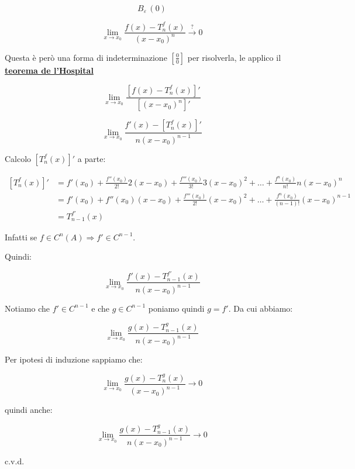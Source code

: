 \documentclass[../../dimostrazioni]{subfiles}
\begin{document}
        \[ B_\varepsilon \, (0)\]

        \[  \lim_{x \to x_0} \frac{f(x)-T _n ^ f (x)}{(x-x_0)^n} \stackrel{?}{\rightarrow} 0\]

        Questa è però una forma di indeterminazione \(\left[\frac{0}{0}\right]\) per risolverla, le applico il \textbf{\hyperref[teoHopital]{teorema de l'Hospital}}
        
        \[  \lim_{x \to x_0} \frac{\left[f(x)-T _n ^ f (x)\right]'}{\left[(x-x_0)^n\right]'}    \]

        \[  \lim_{x \to x_0} \frac{f'(x)-\left[T _n ^ f (x)\right]'}{n(x-x_0)^{n-1}}    \]

        Calcolo \(\left[T _n ^ f (x)\right]'\) a parte:

        \begin{align*}
            \left[T _n ^ f (x)\right]' &= f'(x_0) + \frac{f''(x_0)}{2!}2(x-x_0) + \frac{f'''(x_0)}{3!}3(x-x_0)^2 + \dots + \frac{f^n(x_0)}{n!}n(x-x_0)^n \\
                                    &= f'(x_0) + f''(x_0)(x-x_0) + \frac{f'''(x_0)}{2!}(x-x_0)^2 + \dots + \frac{f^n(x_0)}{(n-1)!}(x-x_0)^{n-1} \\
                                    &= T_{n-1} ^{f'} (x)
        \end{align*}

        Infatti se \(f \in C^n (A) \Rightarrow f' \in C^{n-1} \).

        Quindi:

        \[  \lim_{x \to x_0} \frac{f'(x)-T_{n-1} ^{f'} (x)}{n(x-x_0)^{n-1}}    \]

        Notiamo che \(f' \in C^{n-1}\) e che \(g \in C^{n-1}\) poniamo quindi \(g = f'\). Da cui abbiamo:

        \[  \lim_{x \to x_0} \frac{g(x)-T_{n-1} ^{g} (x)}{n(x-x_0)^{n-1}}    \]

        Per ipotesi di induzione sappiamo che:

        \[  \lim_{x \to x_0} \frac{g(x) - T _n ^ g (x)}{(x-x_0)^{n-1}} \rightarrow 0 \]

        quindi anche:

        \[  \lim_{x \to x_0} \frac{g(x)-T_{n-1} ^{g} (x)}{n(x-x_0)^{n-1}}  \rightarrow 0  \]

        c.v.d.

        
\end{document}
